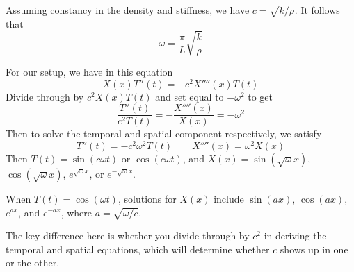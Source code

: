 \documentclass[a4paper]{article}
\begin{document}
\vspace{12pt}


Assuming constancy in the density and stiffness, we have \( c = \sqrt{k / \rho} \). It follows that
\[
	\omega = \frac{\pi}{L}\sqrt{\frac{k}{\rho}} 
\]


For our setup, we have in this equation
\[
	X \!\left( x \right)T''\!\left( t \right) = -c^{2}X''''\!\left( x \right)T \!\left( t \right) 
\]
Divide through by \( c^{2}X \!\left( x \right)T \!\left( t \right) \) and set equal to \( -\omega^{2} \) to get
\[
	\frac{T''\!\left( t \right)}{c^{2}T \!\left( t \right)} = -\frac{X''''\!\left( x \right)}{X \!\left( x \right)} = -\omega^{2}
\]
Then to solve the temporal and spatial component respectively, we satisfy
\[
	T''\!\left( t \right) = -c^{2}\omega^{2}T \!\left( t \right) \qquad X''''\!\left( x \right) = \omega^{2}X \!\left( x \right)
\]
Then \( T \!\left( t \right) = \sin\!\left(c \omega t\right) \) or \( \cos\!\left(c \omega t\right) \), and \( X \!\left( x \right) = \sin\!\left(\sqrt{\omega}x\right) \), \( \cos\!\left(\sqrt{\omega}x\right) \), \( e^{\sqrt{\omega}x} \), or \( e^{-\sqrt{\omega}x} \).

When \( T \!\left( t \right) = \cos\!\left(\omega t\right) \), solutions for \( X \!\left( x \right) \) include \( \sin\!\left(ax\right) \), \( \cos\!\left(ax\right) \), \( e^{ax} \), and \( e^{-ax} \), where \( a = \sqrt{\omega / c} \).

The key difference here is whether you divide through by \( c^{2} \) in deriving the temporal and spatial equations, which will determine whether \( c \) shows up in one or the other.

\vspace{12pt}

\end{document}
